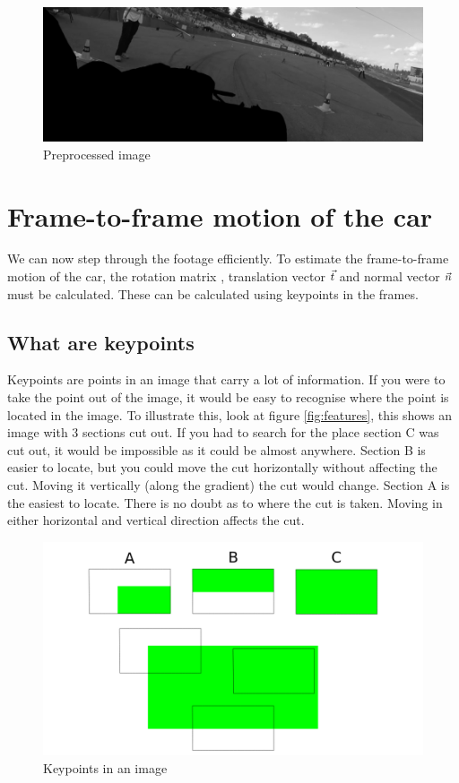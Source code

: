 \begin{figure}
    \centering
    \includegraphics[width=1\textwidth]{figures/output_image.jpg}
    \caption{Preprocessed image}
    \label{fig:output_image}
\end{figure}

\section{Frame-to-frame motion of the car}
We can now step through the footage efficiently. To estimate the frame-to-frame motion of the car, the rotation matrix \MR, translation vector $\vec t$ and normal vector $\vec n$ must be calculated. These can be calculated using keypoints in the frames. 

\subsection{What are keypoints}
Keypoints are points in an image that carry a lot of information. If you were to take the point out of the image, it would be easy to recognise where the point is located in the image. To illustrate this, look at figure \autoref{fig:features}, this shows an image with 3 sections cut out. If you had to search for the place section C was cut out, it would be impossible as it could be almost anywhere. Section B is easier to locate, but you could move the cut horizontally without affecting the cut. Moving it vertically (along the gradient) the cut would change. Section A is the easiest to locate. There is no doubt as to where the cut is taken. Moving in either horizontal and vertical direction affects the cut.\bigskip

\begin{figure}
    \centering
    \includegraphics[width=1\textwidth]{figures/features.png}
    \caption{Keypoints in an image}
    \label{fig:features}
\end{figure}


